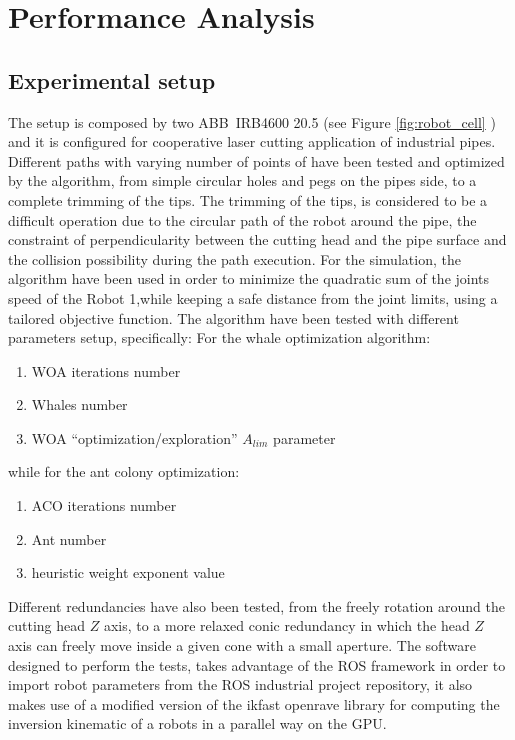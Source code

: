 \documentclass[twocolumn]{svjour3}
\newcommand{\vv}[1]{``#1''}
\newcommand{\figref}[1]{Figure \ref{#1}}
\newcommand{\rev}[1]{\textcolor{verde}{#1}}
\begin{document}
\section{Performance Analysis}
\label{Perf_ana}

\subsection{Experimental setup}
\label{exp_setup}


The setup is composed by two ABB~IRB4600 20.5 (see \figref{fig:robot_cell} ) and it is configured for cooperative laser cutting application of industrial pipes.\\
Different paths with varying number of points of have been tested and optimized by the algorithm, from simple circular holes and pegs on the pipes side, to a complete trimming of the tips.
The trimming of the tips, is considered to be a difficult operation due to the circular path of the robot around the pipe, the constraint of perpendicularity between the cutting head and the pipe surface and the collision possibility during the path execution.
For the simulation, the algorithm have been used in order to minimize the quadratic sum of the joints speed of the Robot 1,while keeping a safe distance from the joint limits, using a tailored objective function.
The algorithm have been tested with different parameters setup, specifically: 
For the whale optimization algorithm:
\begin{enumerate}[-]
	\item WOA iterations number
	\item Whales number
	\item WOA \vv{optimization/exploration} $A_{lim}$ parameter
\end{enumerate}
while for the ant colony optimization:
\begin{enumerate}[-]
	\item ACO iterations number
	\item Ant number 
	\item heuristic weight exponent value
\end{enumerate}
Different redundancies have also been tested, from the freely rotation around the cutting head $Z$ axis, to a more relaxed conic redundancy in which the head $Z$ axis can freely move inside a given cone with a small aperture.
The software designed to perform the tests, takes advantage of the ROS framework in order to import robot parameters from the ROS industrial \cite{rosI:2013} project repository, it also makes use of a modified version of the ikfast openrave library for computing the inversion kinematic of a robots in a parallel way on the GPU.
\end{document}
